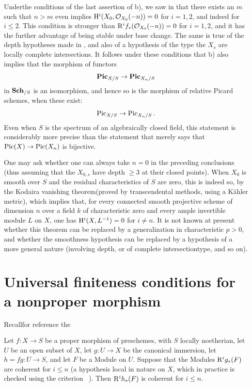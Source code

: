 \begin{remarque} \label{XII.4.10}
Under\pageoriginale the conditions of the last assertion of  b), we saw in  that there exists an $m$ such that $n>m$ even implies $\mathrm H^i(X_0, \mathcal O_{X_0}(-n))=0$ for $i=1,2$, and indeed for $i\leq 2$\sisi{)}{}. This condition is stronger than $\mathrm R^if_{\ast}(\mathcal O_{X_0}(-n))=0$ for $i=1,2$, and it has the further advantage of being stable under base change. The same is true of the depth hypotheses made in , and also of a hypothesis of the type \og the $X_s$ are locally complete intersections\fg. It follows under these conditions that  b) also implies that the morphism of functors
\[
\mathbf{Pic}_{X/S}\to \mathbf{Pic}_{X_n/S}
\]
in $\mathbf{Sch}_{/S}$ is an isomorphism, and hence so is the morphism of relative Picard schemes, when these exist:
\[
\operatorname{Pic}_{X/S}\to \operatorname{Pic}_{X_n/S}.
\]
Even when $S$ is the spectrum of an algebraically closed field, this statement is considerably more precise than the statement that merely says that $\operatorname{Pic}(X)\to \operatorname{Pic}(X_n)$ is bijective.

One may ask whether one can always take $n=0$ in the preceding conclusions (thus assuming that the $X_{0,s}$ have depth $\geq 3$ at their closed points). When $X_0$ is smooth over $S$ and the residual characteristics of $S$ are zero, this is indeed so, by the Kodaira \og vanishing theorem\fg (proved by transcendental methods, using a K\"ahler metric), which implies that, for every connected smooth projective scheme of dimension $n$ over a field $k$ of characteristic zero and every ample invertible module $L$ on $X$, one has $\mathrm H^i(X,L^{-1})=0$ for $i\neq n$. It is not known at present whether this theorem can be replaced by a generalization in characteristic $p>0$, and whether the smoothness hypothesis can be replaced by a hypothesis of a more general nature (involving depth, or of \og complete intersection\fg type, and so on).
\end{remarque}

\section[Universal finiteness conditions]
{Universal finiteness conditions for a nonproper morphism} \label{XII.5} Recall\pageoriginale for reference the \setcounter{equation}{25}

\begin{proposition} \label{XII.5.1}
Let $f:X\to S$ be a proper morphism of preschemes, with $S$ locally noetherian, let $U$ be an open subset of $X$, let $g:U\to X$ be the canonical immersion, let $h=fg:U\to S$, and let $F$ be a Module on $U$. Suppose that the Modules $\mathrm R^ig_\ast(F)$ are coherent for $i\leq n$ (a hypothesis local in nature on $X$, which in practice is checked using the criterion ~). Then $\mathrm R^ih_\ast(F)$ is coherent for $i\leq n$.
\end{proposition}

